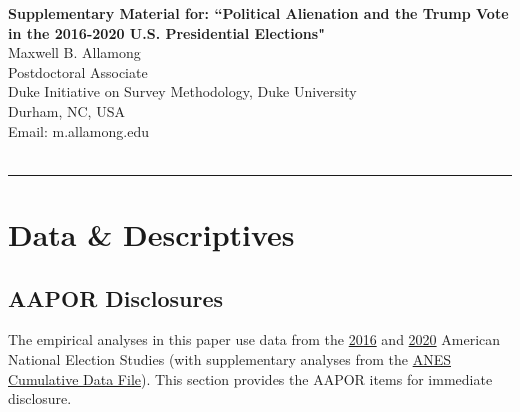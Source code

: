 \documentclass[12pt]{article}
\newcommand\DoToC{%
  \startcontents
  \printcontents{}{1}{\textbf{Table of Contents}\vskip3pt\hrule\vskip5pt}
  \vskip3pt\hrule\vskip5pt
}
\begin{document}
\renewcommand{\appendixname}{SI}
\renewcommand{\appendixpagename}{Supplementary Material}
\renewcommand{\appendixtocname}{SI}

\begin{appendices}
    \renewcommand{\thesubsubsection}{\arabic{section}.\arabic{subsection}.\arabic{subsubsection}}
    \renewcommand{\thesubsection}{\arabic{section}.\arabic{subsection}}
    \renewcommand{\thesection}{\arabic{section}}
    \renewcommand\thefigure{S\arabic{figure}}  
    \renewcommand\thetable{S\arabic{table}}      
    \setcounter{figure}{0} 
    \setcounter{table}{0} 
\begin{refsection}

\doublespacing
\setcounter{page}{1}
{\Large \noindent \textbf{Supplementary Material for: ``Political Alienation and the Trump Vote in the 2016-2020 U.S. Presidential Elections"}} \\
{\noindent Maxwell B. Allamong} \\
{\noindent Postdoctoral Associate} \\
{\noindent Duke Initiative on Survey Methodology, Duke University} \\
{\noindent Durham, NC, USA} \\
{\noindent Email: m.allamong\@duke.edu} \\ \\
\DoToC
\clearpage





\section{Data \& Descriptives}\label{si:data} %

\subsection{AAPOR Disclosures}\label{si:aapor}
\singlespacing
The empirical analyses in this paper use data from the \href{https://electionstudies.org/data-center/2016-time-series-study/}{2016} and \href{https://electionstudies.org/data-center/2020-time-series-study/}{2020} American National Election Studies (with supplementary analyses from the \href{https://electionstudies.org/data-center/anes-time-series-cumulative-data-file/}{ANES Cumulative Data File}). This section provides the AAPOR items for immediate disclosure. 


\end{refsection}
\end{appendices}
\end{document}
